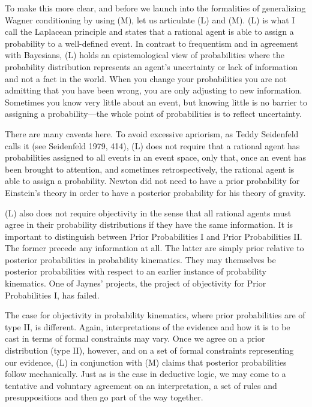 \documentclass[12pt]{article}
\begin{document}
To make this more clear, and before we launch into the formalities of
generalizing Wagner conditioning by using (M), let us articulate (L)
and (M). (L) is what I call the Laplacean principle and states that a
rational agent is able to assign a probability to a well-defined
event. In contrast to frequentism and in agreement with Bayesians, (L)
holds an epistemological view of probabilities where the probability
distribution represents an agent's uncertainty or lack of information
and not a fact in the world. When you change your probabilities you
are not admitting that you have been wrong, you are only adjusting to
new information. Sometimes you know very little about an event, but
knowing little is no barrier to assigning a probability---the whole
point of probabilities is to reflect uncertainty.

There are many caveats here. To avoid excessive apriorism, as Teddy
Seidenfeld calls it (see Seidenfeld 1979, 414), (L) does not require
that a rational agent has probabilities assigned to all events in an
event space, only that, once an event has been brought to attention,
and sometimes retrospectively, the rational agent is able to assign a
probability. Newton did not need to have a prior probability for
Einstein's theory in order to have a posterior probability for his
theory of gravity.

(L) also does not require objectivity in the sense that all rational
agents must agree in their probability distributions if they have the
same information. It is important to distinguish between Prior
Probabilities I and Prior Probabilities II. The former precede any
information at all. The latter are simply prior relative to posterior
probabilities in probability kinematics. They may themselves be
posterior probabilities with respect to an earlier instance of
probability kinematics. One of Jaynes' projects, the project of
objectivity for Prior Probabilities I, has failed. 

The case for objectivity in probability kinematics, where prior
probabilities are of type II, is different. Again, interpretations of
the evidence and how it is to be cast in terms of formal constraints
may vary. Once we agree on a prior distribution (type II), however,
and on a set of formal constraints representing our evidence, (L) in
conjunction with (M) claims that posterior probabilities follow
mechanically. Just as is the case in deductive logic, we may come to a
tentative and voluntary agreement on an interpretation, a set of
rules and presuppositions and then go part of the way together.
\end{document}
